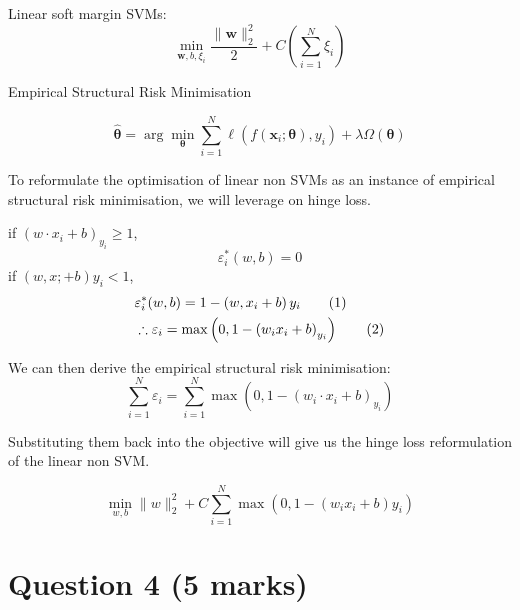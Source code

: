 \documentclass{article}
\newcommand\numberthis{\addtocounter{equation}{1}\tag{\theequation}}
\begin{document}
Linear soft margin SVMs:
\begin{equation}
    \min _{\boldsymbol{w}, b, \xi_i} \frac{\|\boldsymbol{w}\|_2^2}{2}+C\left(\sum_{i=1}^N \xi_i\right)
\end{equation}

Empirical Structural Risk Minimisation

\begin{equation}
    \widehat{\boldsymbol{\theta}}=\arg \min _{\boldsymbol{\theta}} \sum_{i=1}^N \ell\left(f\left(\boldsymbol{x}_i ; \boldsymbol{\theta}\right), y_i\right)+\lambda \Omega(\boldsymbol{\theta})
\end{equation}

To reformulate the optimisation of linear non SVMs as an instance of empirical structural risk minimisation, we will leverage on hinge loss. \\

\begin{center}
    if $\left(w \cdot x_i+b\right)_{y_i} \geqslant 1$, 
    \begin{equation}
        \varepsilon_i^*(w, b)=0
    \end{equation}
    if $(w, x ;+b) y_i<1$,
    \begin{align*}
        & \varepsilon_i^*(w, b)=1-\left(w, x_i+b\right) y_i \numberthis \label{eqn} \\  
        & \therefore \varepsilon_i=\max \left(0,1-\left(w_i x_i+b\right)_{y_i}\right) \numberthis \label{eqn}
    \end{align*} 
    
\end{center}

We can then derive the empirical structural risk minimisation:
\begin{equation}
    \sum_{i=1}^N \varepsilon_i= \sum_{i=1}^N \max \left(0, 1-\left(w_i \cdot x_i+b\right)_{y_i}\right)
\end{equation}

Substituting them back into the objective will give us the hinge loss reformulation of the linear non SVM.

\begin{equation}
    \min _{w, b}\|w\|_2^2+C \sum_{i=1}^N \max \left(0,1-\left(w_i x_i+b\right) y_i\right)
\end{equation}

\section{Question 4 (5 marks)}
\end{document}
